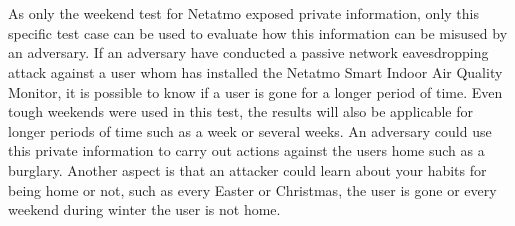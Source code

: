 \\\\
As only the weekend test for Netatmo exposed private information, only this specific test case can be used to evaluate how this information can be misused by an adversary. If an adversary have conducted a passive network eavesdropping attack against a user whom has installed the Netatmo Smart Indoor Air Quality Monitor, it is possible to know if a user is gone for a longer period of time. Even tough weekends were used in this test, the results will also be applicable for longer periods of time such as a week or several weeks. An adversary could use this private information to carry out actions against the users home such as a burglary. Another aspect is that an attacker could learn about your habits for being home or not, such as every Easter or Christmas, the user is gone or every weekend during winter the user is not home. 